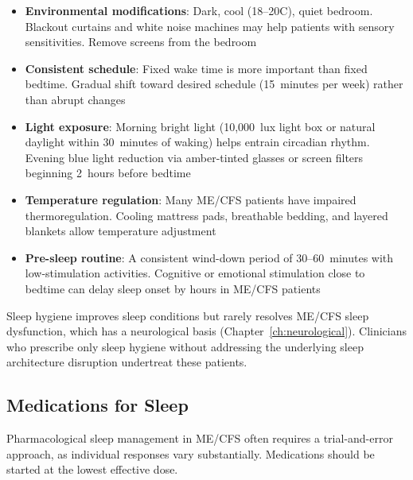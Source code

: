 \begin{itemize}
    \item \textbf{Environmental modifications}: Dark, cool (18--20\textdegree C), quiet bedroom. Blackout curtains and white noise machines may help patients with sensory sensitivities. Remove screens from the bedroom
    \item \textbf{Consistent schedule}: Fixed wake time is more important than fixed bedtime. Gradual shift toward desired schedule (15~minutes per week) rather than abrupt changes
    \item \textbf{Light exposure}: Morning bright light (10,000~lux light box or natural daylight within 30~minutes of waking) helps entrain circadian rhythm. Evening blue light reduction via amber-tinted glasses or screen filters beginning 2~hours before bedtime
    \item \textbf{Temperature regulation}: Many ME/CFS patients have impaired thermoregulation. Cooling mattress pads, breathable bedding, and layered blankets allow temperature adjustment
    \item \textbf{Pre-sleep routine}: A consistent wind-down period of 30--60~minutes with low-stimulation activities. Cognitive or emotional stimulation close to bedtime can delay sleep onset by hours in ME/CFS patients
\end{itemize}

\begin{limitation}
Sleep hygiene improves sleep conditions but rarely resolves ME/CFS sleep dysfunction, which has a neurological basis (Chapter~\ref{ch:neurological}). Clinicians who prescribe only sleep hygiene without addressing the underlying sleep architecture disruption undertreat these patients.
\end{limitation}

\subsection{Medications for Sleep}

Pharmacological sleep management in ME/CFS often requires a trial-and-error approach, as individual responses vary substantially. Medications should be started at the lowest effective dose.

